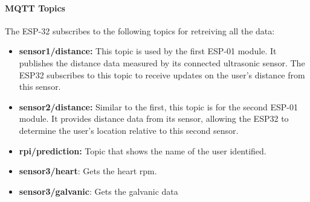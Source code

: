 \paragraph{MQTT Topics}
The ESP-32 subscribes to the following topics for retreiving all the data:
\begin{itemize}
    \item \textbf{sensor1/distance:} This topic is used by the first ESP-01 module. It publishes the distance data measured by its connected ultrasonic sensor. The ESP32 subscribes to this topic to receive updates on the user's distance from this sensor.
    \item \textbf{sensor2/distance:} Similar to the first, this topic is for the second ESP-01 module. It provides distance data from its sensor, allowing the ESP32 to determine the user's location relative to this second sensor.
    \item \textbf{rpi/prediction:} Topic that shows the name of the user identified.
    \item \textbf{sensor3/heart}: Gets the heart rpm.
    \item \textbf{sensor3/galvanic}: Gets the galvanic data
\end{itemize}
